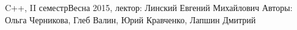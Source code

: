 


\BigHeader
	{C++, II семестр}{Весна 2015, лектор: Линский Евгений Михайлович}
	{Авторы: Ольга Черникова, Глеб Валин, Юрий Кравченко, Лапшин Дмитрий}

 





